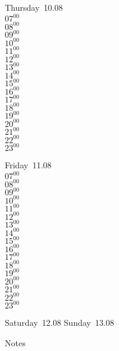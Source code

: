 \documentclass[11pt, a4paper]{book}\usepackage[]{graphicx}\usepackage[]{color}
\begin{document}
\begin{weekdaybox}
  Thursday~10.08\\
  { 
  \vfill
  $07^{00}$\\
$08^{00}$\\
$09^{00}$\\
$10^{00}$\\
$11^{00}$\\
$12^{00}$\\
$13^{00}$\\
$14^{00}$\\
$15^{00}$\\
$16^{00}$\\
$17^{00}$\\
$18^{00}$\\
$19^{00}$\\
$20^{00}$\\
$21^{00}$\\
$22^{00}$\\
$23^{00}$\\
  }
\end{weekdaybox} 
\begin{weekdaybox}
  Friday~11.08\\
  { 
  \vfill
  $07^{00}$\\
$08^{00}$\\
$09^{00}$\\
$10^{00}$\\
$11^{00}$\\
$12^{00}$\\
$13^{00}$\\
$14^{00}$\\
$15^{00}$\\
$16^{00}$\\
$17^{00}$\\
$18^{00}$\\
$19^{00}$\\
$20^{00}$\\
$21^{00}$\\
$22^{00}$\\
$23^{00}$\\
  }
\end{weekdaybox}
\begin{weekendbox}
  Saturday~12.08
  \tcblower
  Sunday~13.08
\end{weekendbox} %
\begin{notebox}
  Notes
\end{notebox}
\clearpage
\end{document}
